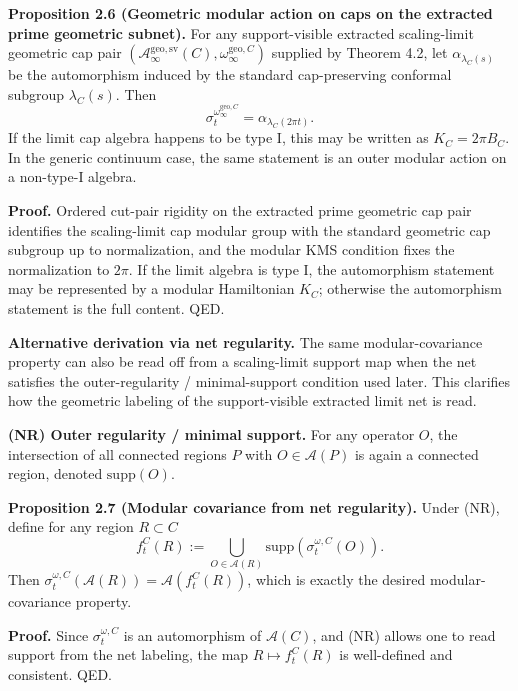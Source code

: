 \textbf{Proposition 2.6 (Geometric modular action on caps on the extracted prime geometric subnet).} For any support-visible extracted scaling-limit geometric cap pair \((\mathcal A_\infty^{\mathrm{geo,sv}}(C),\omega_\infty^{\mathrm{geo},C})\) supplied by Theorem 4.2, let \(\alpha_{\lambda_C(s)}\) be the automorphism induced by the standard cap-preserving conformal subgroup \(\lambda_C(s)\). Then
\[
\sigma_t^{\omega_\infty^{\mathrm{geo},C}}
=
\alpha_{\lambda_C(2\pi t)}.
\]
If the limit cap algebra happens to be type I, this may be written as \(K_C=2\pi B_C\). In the generic continuum case, the same statement is an outer modular action on a non-type-I algebra.

\textbf{Proof.} Ordered cut-pair rigidity on the extracted prime geometric cap pair identifies the scaling-limit cap modular group with the standard geometric cap subgroup up to normalization, and the modular KMS condition fixes the normalization to \(2\pi\). If the limit algebra is type I, the automorphism statement may be represented by a modular Hamiltonian \(K_C\); otherwise the automorphism statement is the full content. QED.

\textbf{Alternative derivation via net regularity.} The same modular-covariance property can also be read off from a scaling-limit support map when the net satisfies the outer-regularity / minimal-support condition used later. This clarifies how the geometric labeling of the support-visible extracted limit net is read.

\textbf{(NR) Outer regularity / minimal support.} For any operator \(O\), the intersection of all connected regions \(P\) with \(O\in\mathcal A(P)\) is again a connected region, denoted \(\mathrm{supp}(O)\).

\textbf{Proposition 2.7 (Modular covariance from net regularity).} Under (NR), define for any region \(R\subset C\)
\[
f_t^C(R)
:=
\bigcup_{O\in \mathcal A(R)}
\mathrm{supp}\!\left(\sigma_t^{\omega,C}(O)\right).
\]
Then \(\sigma_t^{\omega,C}(\mathcal A(R))=\mathcal A(f_t^C(R))\), which is exactly the desired modular-covariance property.

\textbf{Proof.} Since \(\sigma_t^{\omega,C}\) is an automorphism of \(\mathcal A(C)\), and (NR) allows one to read support from the net labeling, the map \(R\mapsto f_t^C(R)\) is well-defined and consistent. QED.

